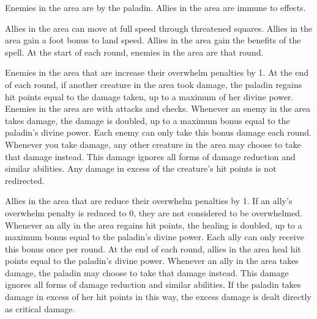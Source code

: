         Enemies in the area are \goaded by the paladin.
        Allies in the area are immune to  effects.

        Allies in the area can move at full speed through threatened squares.
        Allies in the area gain a  foot bonus to land speed.
        Allies in the area gain the benefits of the  spell.
        At the start of each round, enemies in the area are \disoriented that round.

        Enemies in the area that are  increase their overwhelm penalties by 1.
        At the end of each round, if another creature in the area took damage, the paladin regains hit points equal to the damage taken, up to a maximum of her divine power.
        Enemies in the area are \impaired with attacks and checks.
        Whenever an enemy in the area takes damage, the damage is doubled, up to a maximum bonus equal to the paladin's divine power.
        Each enemy can only take this bonus damage each round.
        Whenever you take damage, any other creature in the area may choose to take that damage instead.
        This damage ignores all forms of damage reduction and similar abilities.
        Any damage in excess of the creature's hit points is not redirected.

        Allies in the area that are  reduce their overwhelm penalties by 1.
        If an ally's overwhelm penalty is reduced to 0, they are not considered to be overwhelmed.
        Whenever an ally in the area regains hit points, the healing is doubled, up to a maximum bonus equal to the paladin's divine power.
        Each ally can only receive this bonus once per round.
        At the end of each round, allies in the area heal hit points equal to the paladin's divine power.
        Whenever an ally in the area takes damage, the paladin may choose to take that damage instead.
        This damage ignores all forms of damage reduction and similar abilities.
        If the paladin takes damage in excess of her hit points in this way, the excess damage is dealt directly as critical damage.

